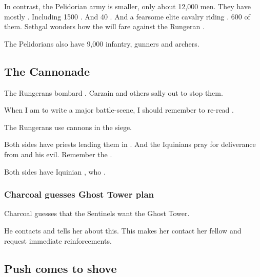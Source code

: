 In contrast, the Pelidorian army is smaller, only about 12,000 men. 
They have mostly \scathae. 
Including 1500 \relcers.
And 40 \murocs. 
And a fearsome elite cavalry riding \grulcans.
600 of them. 
Sethgal wonders how the \grulcans will fare against the Rungeran \mezolisks. 

The Pelidorians also have 9,000 infantry, gunners and archers. 







\subsection{The Cannonade}
The Rungerans bombard \Forclin.
Carzain and others sally out to stop them. 

When I am to write a major battle-scene, I should remember to re-read . 

The Rungerans use cannons in the siege. 

Both sides have priests leading them in . 
And the Iquinians pray for deliverance from  and his evil.
Remember the . 

Both sides have Iquinian , who .





\subsubsection{Charcoal guesses Ghost Tower plan}
Charcoal guesses that the Sentinels want the Ghost Tower.

He contacts \Achsah and tells her about this. 
This makes her contact her fellow \resphain and request immediate reinforcements. 









\subsection{Push comes to shove}





